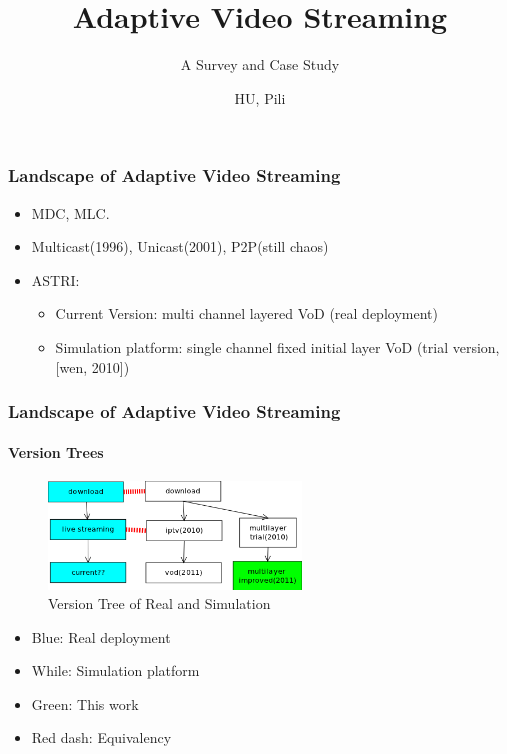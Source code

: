 \documentclass[14pt]{beamer}
\author{HU, Pili}
\title{Adaptive Video Streaming}
\institute{\url{http://personal.ie.cuhk.edu.hk/~hpl011/}}
\subtitle{A Survey and Case Study}
\begin{document}
\begin{frame}
\titlepage
\end{frame}



\begin{frame}
\frametitle{Landscape of Adaptive Video Streaming}
	\begin{itemize}
		\item MDC, MLC. 
		\item Multicast(1996), Unicast(2001), P2P(still chaos)
		\item ASTRI:
			\begin{itemize}
				\item Current Version: multi channel layered VoD 
				(real deployment)
				\item Simulation platform: single channel fixed initial layer
				VoD
				(trial version, [wen, 2010])
			\end{itemize}
	\end{itemize}
\end{frame}

\begin{frame}
\frametitle{Landscape of Adaptive Video Streaming}
\framesubtitle{Version Trees}
\begin{figure}
	\includegraphics[width=0.6\textwidth]{../fig/version_tree.png}
	\caption{Version Tree of Real and Simulation}
\end{figure}
\begin{itemize}
	\item Blue: Real deployment
	\item While: Simulation platform 
	\item Green: This work  
	\item Red dash: Equivalency
\end{itemize}
\end{frame}
\end{document}
